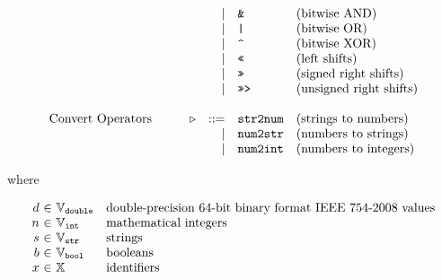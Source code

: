 \[\begin{array}{lrclrll}
    &&&&\mid& \C{\&}                                            & \text{(bitwise AND)}\\
    &&&&\mid& \C{|}                                             & \text{(bitwise OR)}\\
    &&&&\mid& \C{\char`^}                                       & \text{(bitwise XOR)}\\
    &&&&\mid& \C{<<}                                            & \text{(left shifts)}\\
    &&&&\mid& \C{>>}                                            & \text{(signed right shifts)}\\
    &&&&\mid& \C{>>>}                                           & \text{(unsigned right shifts)}\\
    \\
    \text{Convert Operators} &&& \cop &
    ::= & \C{str2num}                                           & \text{(strings to numbers)}\\
    &&&&\mid& \C{num2str}                                       & \text{(numbers to strings)}\\
    &&&&\mid& \C{num2int}                                       & \text{(numbers to integers)}\\
  \end{array}
\]

where

\[
  \begin{array}{r@{~}c@{~}ll}
    \double   &\in& \doubleset  & \text{double-precision 64-bit binary format
                                        IEEE 754-2008 values}\\
    \intvalue &\in& \intset     & \text{mathematical integers}\\
    \str      &\in& \strset     & \text{strings}\\
    \bool     &\in& \boolset    & \text{booleans}\\
    \id       &\in& \idset      & \text{identifiers}\\
  \end{array}
\]

\newpage
